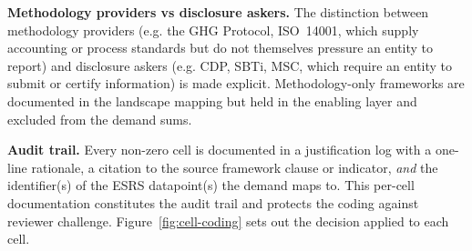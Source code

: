\documentclass[
]{article}
\begin{document}
\textbf{Methodology providers vs disclosure askers.} The distinction
between methodology providers (e.g. the GHG Protocol, ISO~14001, which
supply accounting or process standards but do not themselves pressure an
entity to report) and disclosure askers (e.g. CDP, SBTi, MSC, which
require an entity to submit or certify information) is made explicit.
Methodology-only frameworks are documented in the landscape mapping but
held in the enabling layer and excluded from the demand sums.

\textbf{Audit trail.} Every non-zero cell is documented in a
justification log with a one-line rationale, a citation to the source
framework clause or indicator, \emph{and} the identifier(s) of the ESRS
datapoint(s) the demand maps to. This per-cell documentation constitutes
the audit trail and protects the coding against reviewer challenge.
Figure~\ref{fig:cell-coding} sets out the decision applied to each cell.
\end{document}
